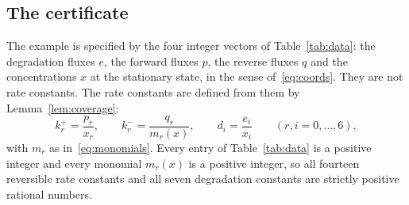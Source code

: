\documentclass[11pt,a4paper]{article}
\theoremstyle{plain}
\theoremstyle{definition}
\theoremstyle{remark}
\numberwithin{equation}{section}
\begin{document}
\subsection{The certificate}
The example is specified by the four integer vectors of Table~\ref{tab:data}: the degradation fluxes $e$, the forward fluxes $p$, the reverse fluxes $q$ and the concentrations $x$ at the stationary state, in the sense of~\eqref{eq:coords}. They are not rate constants. The rate constants are defined from them by Lemma~\ref{lem:coverage}:
\begin{equation}\label{eq:rates}
k_r^+=\frac{p_r}{x_r},\qquad k_r^-=\frac{q_r}{m_r(x)},\qquad d_i=\frac{e_i}{x_i}\qquad(r,i=0,\dots,6),
\end{equation}
with $m_r$ as in~\eqref{eq:monomials}. Every entry of Table~\ref{tab:data} is a positive integer and every monomial $m_r(x)$ is a positive integer, so all fourteen reversible rate constants and all seven degradation constants are strictly positive rational numbers.
\end{document}
